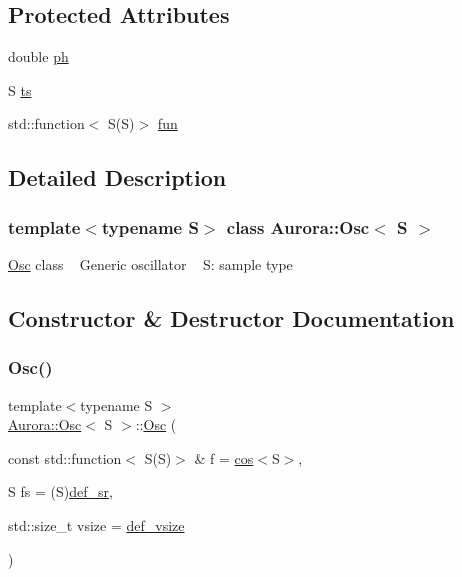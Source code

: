 \subsection*{Protected Attributes}
\begin{DoxyCompactItemize}
\item 
double \hyperlink{class_aurora_1_1_osc_ac649d41b585b377b17eeba66a18dbcc2}{ph}
\item 
S \hyperlink{class_aurora_1_1_osc_a2c7ae380eade4eee2e6035856ed0dcbe}{ts}
\item 
std\+::function$<$ S(S)$>$ \hyperlink{class_aurora_1_1_osc_a18c443a23a6d1fc2e63ba1ee09e97bc4}{fun}
\end{DoxyCompactItemize}


\subsection{Detailed Description}
\subsubsection*{template$<$typename S$>$\newline
class Aurora\+::\+Osc$<$ S $>$}

\hyperlink{class_aurora_1_1_osc}{Osc} class ~\newline
Generic oscillator ~\newline
S\+: sample type 

\subsection{Constructor \& Destructor Documentation}
\mbox{\label{class_aurora_1_1_osc_a573db635ae7ae8fba798d572ee4b992e}} 
\subsubsection{\texorpdfstring{Osc()}{Osc()}}
{\footnotesize\ttfamily template$<$typename S $>$ \\
\hyperlink{class_aurora_1_1_osc}{Aurora\+::\+Osc}$<$ S $>$\+::\hyperlink{class_aurora_1_1_osc}{Osc} (\begin{DoxyParamCaption}\item[{const std\+::function$<$ S(S)$>$ \&}]{f = {\ttfamily \hyperlink{namespace_aurora_ab6ef1b966b8f27d107fcabe1027a677a}{cos}$<$S$>$},  }\item[{S}]{fs = {\ttfamily (S)\hyperlink{namespace_aurora_ad49263d809bea98dd422e95bc91bc03e}{def\+\_\+sr}},  }\item[{std\+::size\+\_\+t}]{vsize = {\ttfamily \hyperlink{namespace_aurora_afaaddf667a06e7ce23c667a8b7295263}{def\+\_\+vsize}} }\end{DoxyParamCaption})\hspace{0.3cm}{\ttfamily [inline]}}

